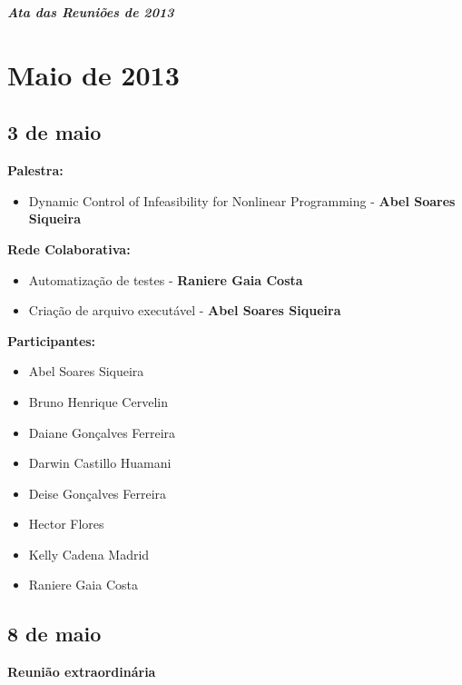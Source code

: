 \documentclass[12pt]{article}
\begin{document}
\centerline{
\textit{\Large\textbf{\emph{{Ata das Reuni\~oes de 2013}}}}}

\vspace{1cm}

\section{Maio de 2013}

\subsection{3 de maio}

{\bf{ Palestra:}}

\begin{itemize}
\item Dynamic Control of Infeasibility for Nonlinear Programming - {\textbf{ Abel Soares Siqueira}}

\end{itemize}
{\bf{Rede Colaborativa:}}

\begin{itemize}
\item Automatiza\c{c}\~ao de testes - {\textbf{ Raniere Gaia Costa}}

\item Cria\c{c}\~ao de arquivo execut\'avel - {\textbf {Abel Soares Siqueira}}

\end{itemize}
{\bf{Participantes:}}

\begin{itemize}
\item Abel Soares Siqueira
\item Bruno Henrique Cervelin
\item Daiane Gon\c{c}alves Ferreira
\item Darwin Castillo Huamani
\item Deise Gon\c{c}alves Ferreira
\item Hector Flores
\item Kelly Cadena Madrid
\item Raniere Gaia Costa
\end{itemize}

\subsection{8 de maio}

{\bf Reuni\~ao extraordin\'aria}
\end{document}

